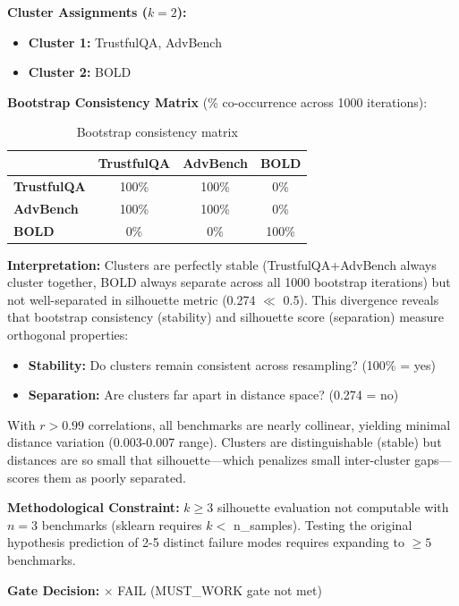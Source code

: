 \textbf{Cluster Assignments ($k=2$):}
\begin{itemize}
\item \textbf{Cluster 1:} TrustfulQA, AdvBench
\item \textbf{Cluster 2:} BOLD
\end{itemize}

\textbf{Bootstrap Consistency Matrix} (\% co-occurrence across 1000 iterations):

\begin{table}[h]
\centering
\begin{tabular}{lccc}
\toprule
 & \textbf{TrustfulQA} & \textbf{AdvBench} & \textbf{BOLD} \\
\midrule
\textbf{TrustfulQA} & 100\% & 100\% & 0\% \\
\textbf{AdvBench} & 100\% & 100\% & 0\% \\
\textbf{BOLD} & 0\% & 0\% & 100\% \\
\bottomrule
\end{tabular}
\caption{Bootstrap consistency matrix}
\end{table}

\textbf{Interpretation:} Clusters are perfectly stable (TrustfulQA+AdvBench always cluster together, BOLD always separate across all 1000 bootstrap iterations) but not well-separated in silhouette metric (0.274 $\ll$ 0.5). This divergence reveals that bootstrap consistency (stability) and silhouette score (separation) measure orthogonal properties:
\begin{itemize}
\item \textbf{Stability:} Do clusters remain consistent across resampling? (100\% = yes)
\item \textbf{Separation:} Are clusters far apart in distance space? (0.274 = no)
\end{itemize}

With $r > 0.99$ correlations, all benchmarks are nearly collinear, yielding minimal distance variation (0.003-0.007 range). Clusters are distinguishable (stable) but distances are so small that silhouette---which penalizes small inter-cluster gaps---scores them as poorly separated.

\textbf{Methodological Constraint:} $k \geq 3$ silhouette evaluation not computable with $n=3$ benchmarks (sklearn requires $k <$ n\_samples). Testing the original hypothesis prediction of 2-5 distinct failure modes requires expanding to $\geq 5$ benchmarks.

\textbf{Gate Decision:} $\times$ FAIL (MUST\_WORK gate not met)


